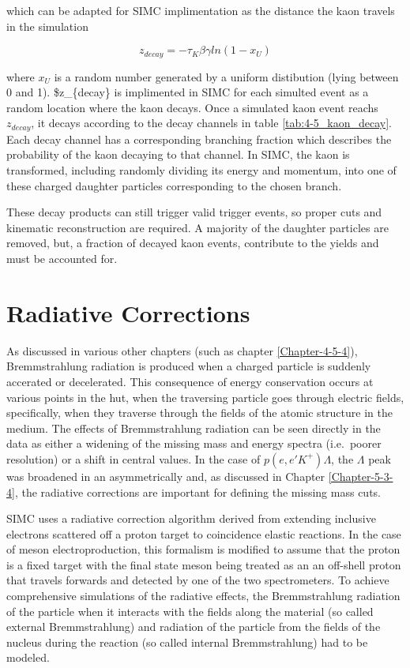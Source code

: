 \documentclass[
]{report}
\begin{document}
\noindent which can be adapted for SIMC implimentation as the distance
the kaon travels in the simulation

\begin{equation} 
  z_{decay}=-\tau_K\beta\gamma ln(1-x_U)
  \label{eq:z_decay} 
\end{equation}

\noindent where \(x_U\) is a random number generated by a uniform
distibution (lying between 0 and 1). \$z\_\{decay\} is implimented in
SIMC for each simulted event as a random location where the kaon decays.
Once a simulated kaon event reachs \(z_{decay}\), it decays according to
the decay channels in table \ref{tab:4-5_kaon_decay}. Each decay channel
has a corresponding branching fraction which describes the probability
of the kaon decaying to that channel. In SIMC, the kaon is transformed,
including randomly dividing its energy and momentum, into one of these
charged daughter particles corresponding to the chosen branch.

These decay products can still trigger valid trigger events, so proper
cuts and kinematic reconstruction are required. A majority of the
daughter particles are removed, but, a fraction of decayed kaon events,
contribute to the yields and must be accounted for.

\hypertarget{Section-6.6}{%
\section{Radiative Corrections}\label{Section-6.6}}

As discussed in various other chapters (such as chapter
\ref{Chapter-4-5-4}), Bremmstrahlung radiation is produced when a
charged particle is suddenly accerated or decelerated. This consequence
of energy conservation occurs at various points in the hut, when the
traversing particle goes through electric fields, specifically, when
they traverse through the fields of the atomic structure in the medium.
The effects of Bremmstrahlung radiation can be seen directly in the data
as either a widening of the missing mass and energy spectra (i.e.~poorer
resolution) or a shift in central values. In the case of
\(p(e,e'K^+)\Lambda\), the \(\Lambda\) peak was broadened in an
asymmetrically and, as discussed in Chapter \ref{Chapter-5-3-4}, the
radiative corrections are important for defining the missing mass cuts.

SIMC uses a radiative correction algorithm derived from extending
inclusive electrons scattered off a proton target to coincidence elastic
reactions. In the case of meson electroproduction, this formalism is
modified to assume that the proton is a fixed target with the final
state meson being treated as an an off-shell proton that travels
forwards and detected by one of the two spectrometers. To achieve
comprehensive simulations of the radiative effects, the Bremmstrahlung
radiation of the particle when it interacts with the fields along the
material (so called external Bremmstrahlung) and radiation of the
particle from the fields of the nucleus during the reaction (so called
internal Bremmstrahlung) had to be modeled.
\end{document}
